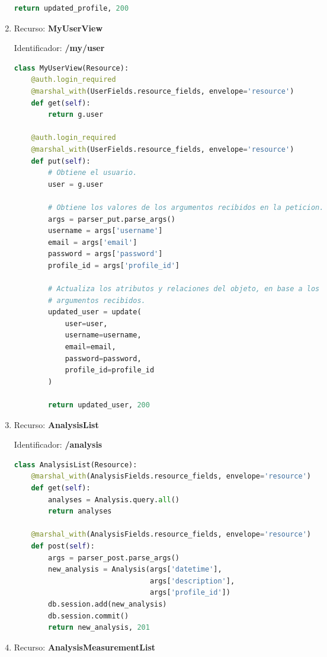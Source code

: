 \begin{enumerate}
\begin{lstlisting}[language=Python]
        return updated_profile, 200
\end{lstlisting}

\item Recurso: \textbf{MyUserView}

Identificador: \textbf{/my/user}

\begin{lstlisting}[language=Python]
class MyUserView(Resource):
    @auth.login_required
    @marshal_with(UserFields.resource_fields, envelope='resource')
    def get(self):
        return g.user

    @auth.login_required
    @marshal_with(UserFields.resource_fields, envelope='resource')
    def put(self):
        # Obtiene el usuario.
        user = g.user

        # Obtiene los valores de los argumentos recibidos en la peticion.
        args = parser_put.parse_args()
        username = args['username']
        email = args['email']
        password = args['password']
        profile_id = args['profile_id']

        # Actualiza los atributos y relaciones del objeto, en base a los
        # argumentos recibidos.
        updated_user = update(
            user=user,
            username=username,
            email=email,
            password=password,
            profile_id=profile_id
        )

        return updated_user, 200
\end{lstlisting}

\item 	Recurso: \textbf{AnalysisList}

Identificador: \textbf{/analysis}

\begin{lstlisting}[language=Python]
class AnalysisList(Resource):
    @marshal_with(AnalysisFields.resource_fields, envelope='resource')
    def get(self):
        analyses = Analysis.query.all()
        return analyses

    @marshal_with(AnalysisFields.resource_fields, envelope='resource')
    def post(self):
        args = parser_post.parse_args()
        new_analysis = Analysis(args['datetime'],
                                args['description'],
                                args['profile_id'])
        db.session.add(new_analysis)
        db.session.commit()
        return new_analysis, 201
\end{lstlisting}

\item Recurso: \textbf{AnalysisMeasurementList}


\end{enumerate}
